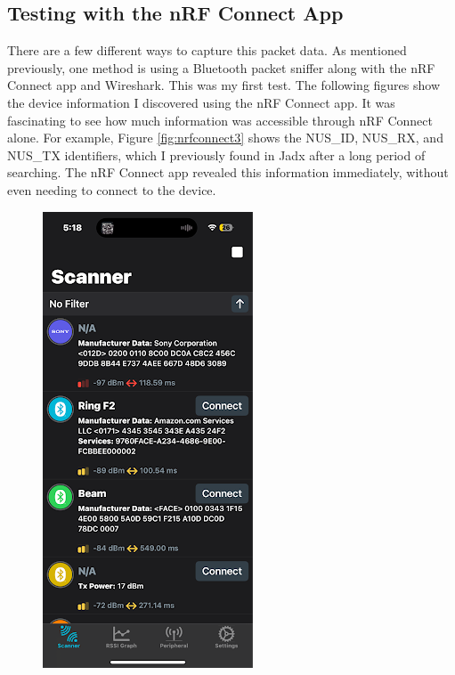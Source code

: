 \subsection{Testing with the nRF Connect App}
There are a few different ways to capture this packet data. As mentioned previously, one method is using a Bluetooth packet sniffer along with the nRF Connect app and Wireshark. This was my first test. The following figures show the device information I discovered using the nRF Connect app. It was fascinating to see how much information was accessible through nRF Connect alone. For example, Figure \ref{fig:nrfconnect3} shows the NUS\_ID, NUS\_RX, and NUS\_TX identifiers, which I previously found in Jadx after a long period of searching. The nRF Connect app revealed this information immediately, without even needing to connect to the device.
\begin{figure}[H]
	\centering
	\begin{minipage}{0.32\textwidth}
		\centering
		\includegraphics[width=0.8\linewidth]{nrfconnect1}

\end{minipage}
\end{figure}
